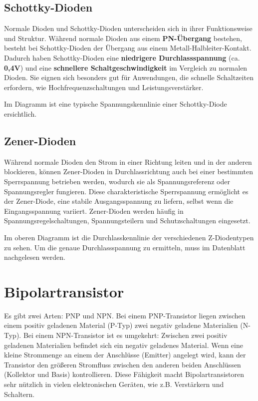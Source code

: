 \subsection{Schottky-Dioden}
Normale Dioden und Schottky-Dioden unterscheiden sich in ihrer Funktionsweise und Struktur. Während normale Dioden aus einem \textbf{PN-Übergang} bestehen, besteht bei Schottky-Dioden der Übergang aus einem Metall-Halbleiter-Kontakt. Dadurch haben Schottky-Dioden eine \textbf{niedrigere Durchlassspannung} (ca. \textbf{0,4V}) und eine \textbf{schnellere Schaltgeschwindigkeit} im Vergleich zu normalen Dioden. Sie eignen sich besonders gut für Anwendungen, die schnelle Schaltzeiten erfordern, wie Hochfrequenzschaltungen und Leistungsverstärker.

Im Diagramm ist eine typische Spannungskennlinie einer Schottky-Diode ersichtlich.

\subsection{Zener-Dioden}
Während normale Dioden den Strom in einer Richtung leiten und in der anderen blockieren, können Zener-Dioden in Durchlassrichtung auch bei einer bestimmten Sperrspannung betrieben werden, wodurch sie als Spannungsreferenz oder Spannungsregler fungieren. Diese charakteristische Sperrspannung ermöglicht es der Zener-Diode, eine stabile Ausgangsspannung zu liefern, selbst wenn die Eingangsspannung variiert. Zener-Dioden werden häufig in Spannungsregelschaltungen, Spannungsteilern und Schutzschaltungen eingesetzt.


Im oberen Diagramm ist die Durchlasskennlinie der verschiedenen Z-Diodentypen zu sehen. Um die genaue Durchlassspannung zu ermitteln, muss im Datenblatt nachgelesen werden.

\section{Bipolartransistor}
Es gibt zwei Arten: PNP und NPN. Bei einem PNP-Transistor liegen zwischen einem positiv geladenen Material (P-Typ) zwei negativ geladene Materialien (N-Typ). Bei einem NPN-Transistor ist es umgekehrt: Zwischen zwei positiv geladenen Materialien befindet sich ein negativ geladenes Material. Wenn eine kleine Strommenge an einem der Anschlüsse (Emitter) angelegt wird, kann der Transistor den größeren Stromfluss zwischen den anderen beiden Anschlüssen (Kollektor und Basis) kontrollieren. Diese Fähigkeit macht Bipolartransistoren sehr nützlich in vielen elektronischen Geräten, wie z.B. Verstärkern und Schaltern.

